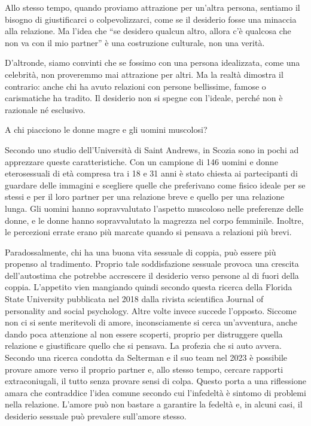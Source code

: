 \documentclass[12pt]{book} %
\begin{document}
Allo stesso tempo, quando proviamo attrazione per un’altra persona, sentiamo il bisogno di giustificarci o colpevolizzarci, come se il desiderio fosse una minaccia alla relazione. Ma l’idea che “se desidero qualcun altro, allora c’è qualcosa che non va con il mio partner” è una costruzione culturale, non una verità.

D’altronde, siamo convinti che se fossimo con una persona idealizzata, come una celebrità, non proveremmo mai attrazione per altri. Ma la realtà dimostra il contrario: anche chi ha avuto relazioni con persone bellissime, famose o carismatiche ha tradito. Il desiderio non si spegne con l’ideale, perché non è razionale né esclusivo.

\begin{mdframed}[linewidth=1pt]
A chi piacciono le donne magre e gli uomini muscolosi?

Secondo uno studio dell'Università di Saint Andrews, in Scozia sono in pochi ad apprezzare queste caratteristiche. Con
un campione di 146 uomini e donne eterosessuali di età compresa tra i 18 e 31 anni è stato chiesta ai partecipanti di
guardare delle immagini e scegliere quelle che preferivano come fisico ideale per se stessi e per il loro partner per
una relazione breve e quello per una relazione lunga. Gli uomini hanno sopravvalutato l'aspetto muscoloso nelle
preferenze delle donne, e le donne hanno sopravvalutato la magrezza nel corpo femminile. Inoltre, le percezioni errate
erano più marcate quando si pensava a relazioni più brevi.
\end{mdframed}

Paradossalmente, chi ha una buona vita sessuale di coppia, può essere più propenso al tradimento. Proprio tale
soddisfazione sessuale provoca una crescita dell'autostima che potrebbe accrescere il desiderio
verso persone al di fuori della coppia. L'appetito vien mangiando quindi secondo questa ricerca
della Florida State University pubblicata nel 2018 dalla rivista scientifica Journal of personality and social
psychology. Altre volte invece succede l'opposto. Siccome non ci si sente meritevoli di amore,
inconsciamente si cerca un'avventura, anche dando poca attenzione al non essere scoperti, proprio
per distruggere quella relazione e giustificare quello che si pensava. La profezia che si auto avvera.
Secondo una ricerca condotta da Selterman e il suo team nel 2023 è possibile provare amore verso il proprio partner e, allo stesso tempo, cercare rapporti extraconiugali, il tutto senza provare sensi di colpa. Questo porta a una riflessione amara che contraddice l'idea comune secondo cui l'infedeltà è sintomo di problemi nella relazione. L'amore può non bastare a garantire la fedeltà e, in alcuni casi, il desiderio sessuale può prevalere sull'amore stesso.
\end{document}

